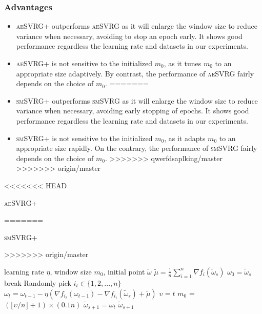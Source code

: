 \documentclass[conference]{IEEEtran}
\begin{document}
\begin{algorithm}[t]
\begin{itemize}
 
 \subsubsection{Advantages}
 \begin{itemize}
<<<<<<< HEAD
 \item \textsc{aeSVRG+} outperforms \textsc{aeSVRG} as it will enlarge the window size to reduce variance when necessary, avoiding to stop an epoch early. It shows good performance regardless the learning rate and datasets in  our experiments. 
 \item \textsc{aeSVRG+} is not sensitive to the initialized $m_0$, as it tunes $m_0$ to an appropriate size adaptively. By contrast, the performance of \textsc{aeSVRG} fairly depends on the choice of $m_0$.
=======
 \item \textsc{smSVRG+} outperforms \textsc{smSVRG} as it will enlarge the window size to reduce variance when necessary, avoiding early stopping of epochs. It shows good performance regardless the learning rate and datasets in  our experiments.  
 \item \textsc{smSVRG+} is not sensitive to the initialized $m_0$, as it adapts $m_0$ to an appropriate size rapidly. On the contrary, the performance of \textsc{smSVRG} fairly depends on the choice of $m_0$.
>>>>>>> qwerfdsaplking/master
>>>>>>> origin/master
 \end{itemize}
 
 

 \begin{algorithm}[t]
<<<<<<< HEAD
 	\caption{\textsc{aeSVRG+}}
	\label{aeSVRG+}
=======
 	\caption{\textsc{smSVRG+}}
	\label{smSVRG+}
>>>>>>> origin/master
	\begin{algorithmic}[1]
	\Require learning rate $\eta$, window size $m_0$, initial point $\tilde{\omega}$
		\State $\tilde{\mu} = \frac{1}{n}\sum\limits_{i=1}^{n}\nabla f_{i}(\tilde{\omega}_{s})$
		\State $\omega_0 = \tilde{\omega}_s$
			\State break
			\EndIf
			\State Randomly pick $i_t\in\{1, 2, ..., n\}$
			\State $\omega_t = \omega_{t-1} - \eta(\nabla f_{i_t}(\omega_{t-1}) - \nabla f_{i_t}(\tilde{\omega}_s)+\tilde{\mu})$
		\EndFor
		\State $\upsilon = t$	
		\State $m_0$ = $(\lfloor \upsilon/n \rfloor+1) \times (0.1n)$
		\State $\tilde{\omega}_{s+1} = \omega_{t}$
	\EndFor
	\State \Return $\tilde{\omega}_{s+1}$
	\end{algorithmic}
\end{algorithm}
 

\end{itemize}
\end{algorithm}
\end{document}
